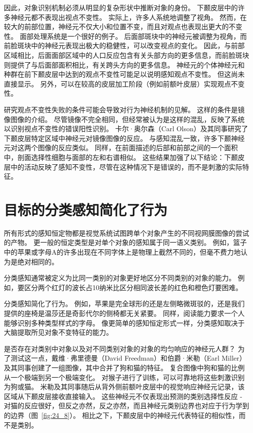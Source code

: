 因此，对象识别机制必须从明显的复杂形状中推断对象的身份。
下颞皮层中的许多神经元都不表现出视点不变性。
实际上，许多人系统地调整了视角。
然而，在较大的前部位置，神经元不仅大小和位置不变，而且对观点也表现出更大的不变性。
面部处理系统是一个很好的例子。
后面部斑块中的神经元被调整为视角，而前脸斑块中的神经元表现出极大的稳健性，可以改变视点的变化。
因此，与前部区域相比，后面面部区域中的人口反应包含有关头部方向的更多信息，而前脸斑块则提供了与后面部面积相比，有关跨头方向的更多信息。
神经元的个体神经元和种群在前下颞皮层中达到的观点不变性可能足以说明感知观点不变性。
但这尚未直接显示。
另外，可以在较高的皮层加工阶段（例如前额叶皮层）实现观点不变性。


研究观点不变性失败的条件可能会导致对行为神经机制的见解。
这样的条件是镜像图像的介绍。
尽管镜像不完全相同，但经常被认为是这样的混乱，反映了系统以识别视点不变性的错误阳性识别。
卡尔·奥尔森（Carl Olson）及其同事研究了下颞皮层特定区域中神经元对镜像图像的反应。
与感知混乱一致，许多下颞神经元对这两个图像的反应类似。
同样，在前面描述的后部和前部之间的一个面积中，剖面选择性细胞与面部的左和右谱相似。
这些结果加强了以下结论：下颞皮层中的活动反映了感知不变性，尽管在这种情况下是错误的，而不是刺激的实际特征。



\section{目标的分类感知简化了行为}

所有形式的感知恒定物都是视觉系统试图跨单个对象产生的不同视网膜图像的尝试的产物。
更一般的恒定类型是对单个对象的感知属于同一语义类别。
例如，篮子中的苹果或字母A的许多出现在不同字体上是物理上截然不同的，但毫不费力地认为是绝对相同的。


分类感知通常被定义为比同一类别的对象更好地区分不同类别的对象的能力。
例如，要区分两个红灯的波长占10纳米比区分相同波长差的红色和橙色灯要困难。


分类感知简化了行为。
例如，苹果是完全球形的还是左侧略微斑驳的，还是我们提供的座椅是温莎还是奇彭代尔的侧椅都无关紧要。
同样，阅读能力要求一个人能够识别多种类型样式的字母。
像更简单的感知恒定形式一样，分类感知取决于大脑提取所见对象不变特征的能力。


是否存在对类别中对象以及对不同类别对象的对象的均匀响应的神经元人群？
为了测试这一点，戴维·弗里德曼（David Freedman）和伯爵·米勒（Earl Miller）及其同事创建了一组图像，其中合并了狗和猫的特征。
复合图像中狗和猫的比例从一个极端到另一个极端变化。 
对猴子进行了训练，可以可靠地将这些刺激识别为狗或猫。
米勒及其同事随后从背外侧前额叶皮层中的视觉响应神经元记录，该区域从下颞皮层接收直接输入。
这些神经元不仅表现出预测的类别选择性反应 - 对猫的反应很好，但反之亦然，反之亦然，而且神经元类别边界也对应于行为学到的边界（图~\ref{fig:24_8}）。 
相比之下，下颞皮层中的神经元代表特征的相似性，而不是类别。


